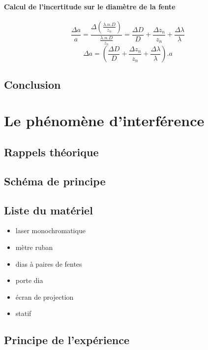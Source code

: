 \documentclass[11pt,a4paper]{report}
\begin{document}
		\subsubsection{Calcul de l'incertitude sur le diamètre de la fente}
		\begin{equation}
		\frac{\Delta a}{a} =\frac{\Delta\left(\frac{\lambda.n.D}{z_{n}}\right)}{ \frac{\lambda.n.D}{z_{n}}} = \frac{\Delta D}{D}+\frac{\Delta z_{n}}{z_{n}}+ \frac{\Delta \lambda}{\lambda}
		\end{equation}
		\begin{equation}
		\Delta a = \left(\frac{\Delta D}{D}+\frac{\Delta z_{n}}{z_{n}}+\frac{\Delta \lambda}{\lambda}\right).a
		\end{equation}
	\section{Conclusion}
\chapter{Le phénomène d'interférence}
	\section{Rappels théorique}
	\section{Schéma de principe}
	\section{Liste du matériel}
	\begin{itemize}
	\item laser monochromatique
	\item mètre ruban
	\item dias à paires de fentes
	\item porte dia
	\item écran de projection
	\item statif
	\end{itemize}
	\section{Principe de l'expérience}
\end{document}
